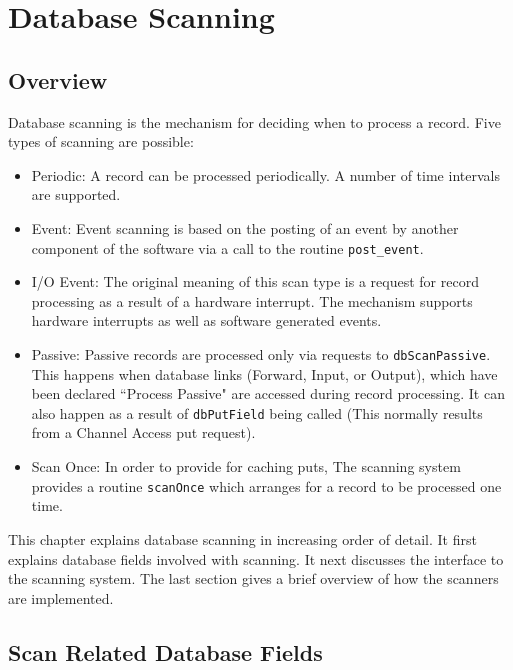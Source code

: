 \chapter{Database Scanning}

\section{Overview}

Database scanning is the mechanism for deciding when to process a record. Five types of scanning are possible:

\begin{itemize}\item {}Periodic:  A record can be processed periodically. A number of time intervals are supported.

\item {}Event:  Event scanning is based on the posting of an event by another component of the software via a call to the 
routine \verb|post_event|.

\item {}I/O Event:  The original meaning of this scan type is a request for record processing as a result of a hardware 
interrupt. The mechanism supports hardware interrupts as well as software generated events.

\item {}Passive:  Passive records are processed only via requests to \verb|dbScanPassive|. This happens when database links 
(Forward, Input, or Output), which have been declared ``Process Passive" are accessed during record processing. It 
can also happen as a result of \verb|dbPutField| being called (This normally results from a Channel Access put 
request).

\item {}Scan Once:  In order to provide for caching puts, The scanning system provides a routine \verb|scanOnce| which 
arranges for a record to be processed one time.

\end{itemize}This chapter explains database scanning in increasing order of detail. It first explains database fields involved with 
scanning. It next discusses the interface to the scanning system. The last section gives a brief overview of how the 
scanners are implemented. 

\section{Scan Related Database Fields}

